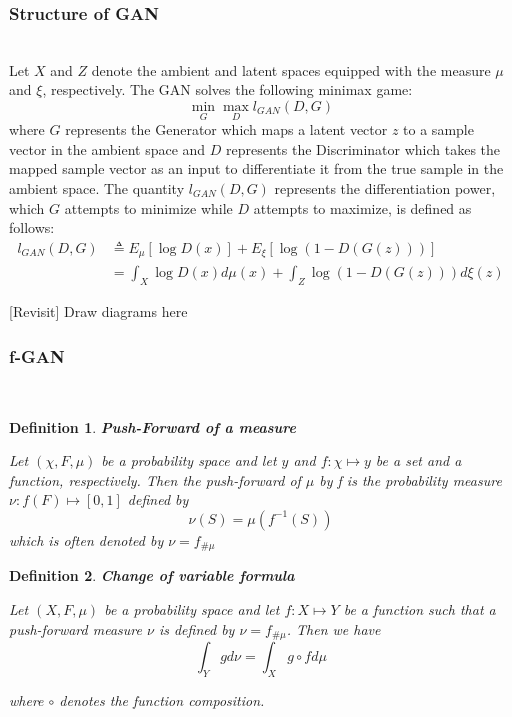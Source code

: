 \documentclass[12pt]{amsart}
\newtheorem{definition}{Definition}
\theoremstyle{plain}
\theoremstyle{definition}
\theoremstyle{remark}
\numberwithin{equation}{section}
\numberwithin{thm}{section}
\begin{document}
\subsubsection{\textbf{Structure of GAN}} ~\\
Let $X$ and $Z$ denote the ambient and latent spaces equipped with the measure $\mu$ and $\xi$, respectively. The GAN solves the following minimax game:
\begin{equation}
    \min_{G}\max_{D}l_{GAN}(D,G)
\end{equation}
where $G$ represents the Generator which maps a latent vector $z$ to a sample vector in the ambient space and $D$ represents the Discriminator which takes the mapped sample vector as an input to differentiate it from the true sample in the ambient space. The quantity $l_{GAN}(D,G)$ represents the differentiation power, which $G$ attempts to minimize while $D$ attempts to maximize, is defined as follows:
\begin{equation}
    \begin{aligned}
    l_{GAN}(D,G) & \triangleq E_{\mu}[\log D(x)]+E_{\xi}[\log(1-D(G(z)))] \\
    & = \int_{X}\log D(x)d\mu(x) + \int_{Z}\log(1-D(G(z)))d\xi(z)
    \end{aligned}
\end{equation}

[Revisit] Draw diagrams here

\subsubsection{\textbf{f-GAN}} ~\\

\begin{definition} 
\textbf{Push-Forward of a measure}

Let $(\chi,F,\mu)$ be a probability space and let $y$ and $f:\chi \mapsto y $ be a set and a function, respectively. Then the push-forward of $\mu$ by f is the probability measure $\nu : f(F) \mapsto [0,1]$ defined by 
\begin{equation}
    \nu(S) = \mu(f^{-1}(S))
\end{equation}
which is often denoted by $\nu=f_{\#\mu}$
\end{definition}

\begin{definition} 
\textbf{Change of variable formula}

Let $(X,F,\mu)$ be a probability space and let $f: X \mapsto Y$ be a function such that a push-forward measure $\nu$ is defined by $\nu=f_{\#\mu}$. Then we have
\begin{equation}
\int_{Y}gd\nu = \int_{X}g\circ fd\mu  
\end{equation}

where $\circ$ denotes the function composition.
\end{definition}
\end{document}
